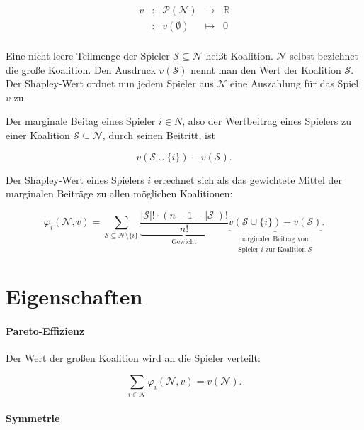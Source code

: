 \[
\begin{array}{rcccl}
  v &:  &\mathcal P(\mathcal{N}) &\longrightarrow &\mathbb{R}\\
  &: &v(\emptyset) &\mapsto &0\\
\end{array}
\]

Eine nicht leere Teilmenge der Spieler $\mathcal{S} \subseteq \mathcal{N}$ heißt Koalition. $\mathcal{N}$ selbst bezichnet die große Koalition. Den Ausdruck $v(\mathcal{S})$ nennt man den Wert der Koalition $\mathcal{S}$.
Der Shapley-Wert ordnet nun jedem Spieler aus $\mathcal{N}$ eine Auszahlung für das Spiel $v$ zu.

Der marginale Beitag eines Spieler $i \in N$, also der Wertbeitrag eines Spielers zu einer Koalition $\mathcal{S} \subseteq \mathcal{N}$, durch seinen Beitritt, ist

\begin{equation*}
v(\mathcal{S} \cup \{i\}) - v(\mathcal{S}).
\end{equation*}

Der Shapley-Wert eines Spielers $i$ errechnet sich als das gewichtete Mittel der marginalen Beiträge zu allen möglichen Koalitionen:

\begin{equation*}
\varphi_i (\mathcal{N}, v) = \sum_{\mathcal{S} \subseteq \mathcal{N} \setminus \{i\}} \underbrace{\frac{|\mathcal{S}|! \cdot (n - 1 - |\mathcal{S}|)!}{n!}}_{\text{Gewicht}} \underbrace{v(\mathcal{S} \cup \{i\}) - v(\mathcal{S})}_{\substack{\text{marginaler Beitrag von} \\ \text{Spieler $i$ zur Koalition $\mathcal{S}$}}}.
\end{equation*}

\section{Eigenschaften}

\paragraph{Pareto-Effizienz}

Der Wert der großen Koalition wird an die Spieler verteilt:

\begin{equation*}
\sum_{i \in \mathcal{N}} \varphi_i (\mathcal{N}, v) = v(\mathcal{N}).
\end{equation*}

\paragraph{Symmetrie}


